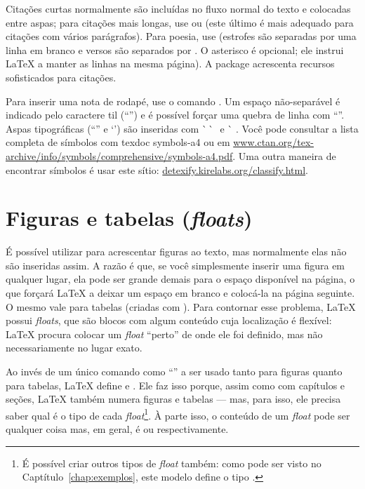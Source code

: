 Citações curtas normalmente são incluídas no fluxo normal do texto e colocadas
entre aspas; para citações mais longas, use  ou
 (este último é mais adequado para citações com
vários parágrafos). Para poesia, use  (estrofes são separadas por
uma linha em branco e versos são separados por \cmd{\sla\sla{}*}. O asterisco
é opcional; ele instrui \LaTeX{} a manter as linhas na mesma página). A package
 acrescenta recursos sofisticados para citações.

Para inserir uma nota de rodapé, use o comando
. Um espaço
não-separável é indicado pelo caractere til (``\cmd{\textasciitilde{}}'')
e é possível forçar uma quebra de linha com ``\cmd{\sla\sla{}}''. Aspas
tipográficas (``\;'' e `\;') são inseridas com
\`\space\,\`\space\space\,\textquotesingle\,\textquotesingle{} e
\`\space\,\,\textquotesingle. Você pode consultar a lista completa de
símbolos com \textsf{texdoc symbols-a4} ou em \url{www.ctan.org/tex-archive/info/symbols/comprehensive/symbols-a4.pdf}.
Uma outra maneira de encontrar símbolos é usar este sítio: \url{detexify.kirelabs.org/classify.html}.

\section{Figuras e tabelas (\emph{floats})}
\label{sec:floats}

É possível utilizar  para acrescentar figuras
ao texto, mas normalmente elas não são inseridas assim. A razão é que,
se você simplesmente inserir uma figura em qualquer lugar, ela pode
ser grande demais para o espaço disponível na página, o que forçará
\LaTeX{} a deixar um espaço em branco e colocá-la na página seguinte.
O mesmo vale para tabelas (criadas com ).
Para contornar esse problema, \LaTeX{} possui \emph{floats}, que
são blocos com algum conteúdo cuja localização é flexível: \LaTeX{}
procura colocar um \emph{float} ``perto'' de onde ele foi definido,
mas não necessariamente no lugar exato.

Ao invés de um único comando como ``'' a
ser usado tanto para figuras quanto para tabelas, \LaTeX{} define
 e . Ele faz isso
porque, assim como com capítulos e seções, \LaTeX{} também numera
figuras e tabelas --- mas, para isso, ele precisa saber qual é o tipo de
cada \emph{float}\footnote{É possível criar outros tipos de \emph{float}
também: como pode ser visto no Captítulo~\ref{chap:exemplos}, este
modelo define o tipo .}. À parte isso, o conteúdo de
um \emph{float} pode ser qualquer coisa mas, em geral, é
 ou  respectivamente.

